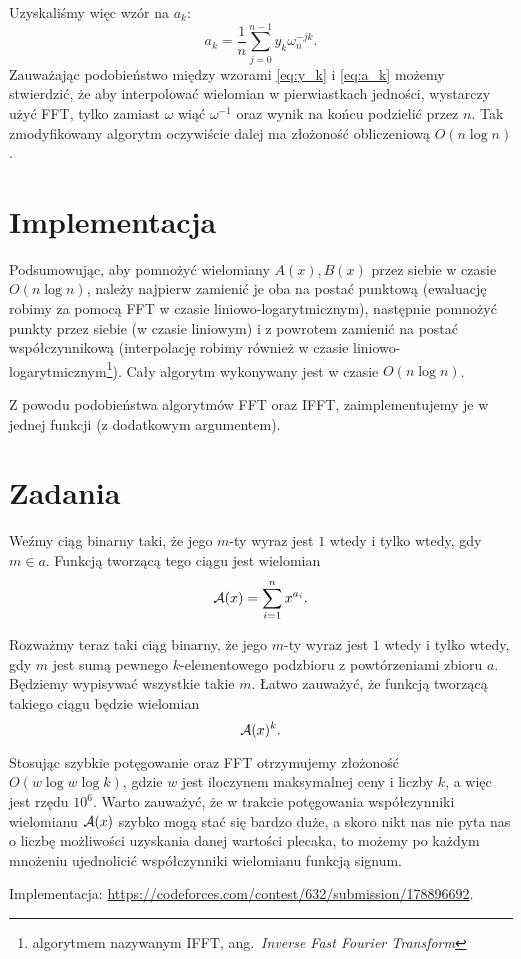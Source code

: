 \documentclass[11pt]{scrartcl}
\begin{document}
    Uzyskaliśmy więc wzór na $a_k$:
    \begin{equation}
        \label{eq:a_k}
        a_k = \frac{1}{n} \sum_{j=0}^{n-1} y_k\omega_n^{-jk}.
    \end{equation}
    Zauważając podobieństwo między wzorami \ref{eq:y_k} i \ref{eq:a_k} możemy stwierdzić, że aby interpolować wielomian w pierwiastkach jedności, wystarczy użyć FFT, tylko zamiast $\omega$ wiąć $\omega^{-1}$ oraz wynik na końcu podzielić przez $n$. Tak zmodyfikowany algorytm oczywiście dalej ma złożoność obliczeniową $O(n\log n)$.

\section{Implementacja}
    Podsumowując, aby pomnożyć wielomiany $A(x), B(x)$ przez siebie w czasie $O(n\log n)$, należy najpierw zamienić je oba na postać punktową (ewaluację robimy za pomocą FFT w czasie liniowo-logarytmicznym), następnie pomnożyć punkty przez siebie (w czasie liniowym) i z powrotem zamienić na postać współczynnikową (interpolację robimy również w czasie liniowo-logarytmicznym\footnote{algorytmem nazywanym IFFT, ang.\ \textit{Inverse Fast Fourier Transform}}). Cały algorytm wykonywany jest w czasie $O(n\log n)$.

    Z powodu podobieństwa algorytmów FFT oraz IFFT, zaimplementujemy je w jednej funkcji (z dodatkowym argumentem).

    

\section{Zadania}
    \begin{problem}
        \begin{answer}
            Weźmy ciąg binarny taki, że jego $m$-ty wyraz jest $1$ wtedy i tylko wtedy, gdy $m \in a$. Funkcją tworzącą tego ciągu jest wielomian
            $$ \mathcal A(x) = \sum_{i=1}^n x^{a_i}. $$

            Rozważmy teraz taki ciąg binarny, że jego $m$-ty wyraz jest $1$ wtedy i tylko wtedy, gdy $m$ jest sumą pewnego $k$-elementowego podzbioru z powtórzeniami zbioru $a$. Będziemy wypisywać wszystkie takie $m$. Łatwo zauważyć, że funkcją tworzącą takiego ciągu będzie wielomian
            $$ \mathcal A(x)^k. $$

            Stosując szybkie potęgowanie oraz FFT otrzymujemy złożoność $O(w\log{w}\log{k})$, gdzie $w$ jest iloczynem maksymalnej ceny i liczby $k$, a więc jest rzędu $10^6$. Warto zauważyć, że w trakcie potęgowania współczynniki wielomianu $\mathcal A(x)$ szybko mogą stać się bardzo duże, a skoro nikt nas nie pyta nas o liczbę możliwości uzyskania danej wartości plecaka, to możemy po każdym mnożeniu ujednolicić współczynniki wielomianu funkcją signum.

            Implementacja: \url{https://codeforces.com/contest/632/submission/178896692}.
        \end{answer}
    \end{problem}
\end{document}
